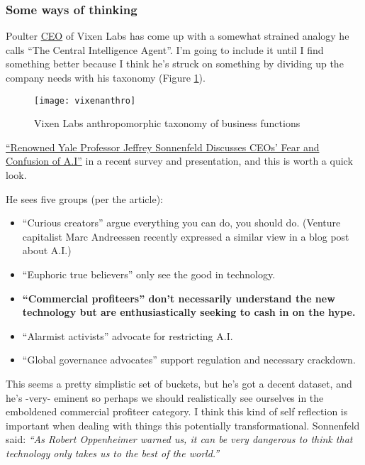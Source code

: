 \subsubsection{Some ways of thinking}
Poulter \href{https://twitter.com/jamespoulter}{CEO} of Vixen Labs has come up with a somewhat strained analogy he calls ``The Central Intelligence Agent''. I'm going to include it until I find something better because I think he's struck on something by dividing up the company needs with his taxonomy (Figure \ref{fig:vixenAnthro}).
\begin{figure}[H]
    \centering
    \texttt{[image: vixenanthro]}
    \caption{Vixen Labs anthropomorphic taxonomy of business functions}
    \label{fig:vixenAnthro}
\end{figure}
\href{https://observer.com/2023/06/ceo-ai-survey-yale-professor/}{``Renowned Yale Professor Jeffrey Sonnenfeld Discusses CEOs’ Fear and Confusion of A.I''} in a recent survey and presentation, and this is worth a quick look.\par
He sees five groups (per the article):
\begin{itemize}
\item ``Curious creators'' argue everything you can do, you should do. (Venture capitalist Marc Andreessen recently expressed a similar view in a blog post about A.I.)
\item ``Euphoric true believers'' only see the good in technology.
\item \textbf{``Commercial profiteers'' don’t necessarily understand the new technology but are enthusiastically seeking to cash in on the hype.}
\item ``Alarmist activists'' advocate for restricting A.I.
\item ``Global governance advocates'' support regulation and necessary crackdown.
\end{itemize}
This seems a pretty simplistic set of buckets, but he's got a decent dataset, and he's -very- eminent so perhaps we should realistically see ourselves in the emboldened commercial profiteer category. I think this kind of self reflection is important when dealing with things this potentially transformational. Sonnenfeld said: \textit{``As Robert Oppenheimer warned us, it can be very dangerous to think that technology only takes us to the best of the world.''}
